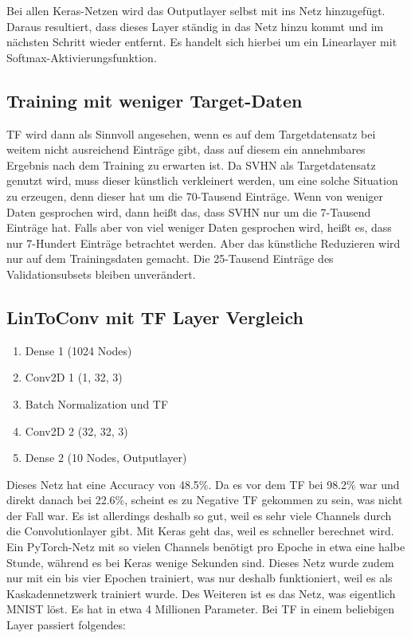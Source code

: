     Bei allen Keras-Netzen wird das Outputlayer selbst mit ins Netz hinzugefügt. Daraus 
    resultiert, dass dieses Layer ständig in das Netz hinzu kommt und im nächsten Schritt 
    wieder entfernt. Es handelt sich hierbei um ein Linearlayer mit Softmax-Aktivierungsfunktion. 

\subsection{Training mit weniger Target-Daten}
    TF wird dann als Sinnvoll angesehen, wenn es auf dem Targetdatensatz bei weitem nicht ausreichend 
    Einträge gibt, dass auf diesem ein annehmbares Ergebnis nach dem Training zu erwarten ist. Da SVHN 
    als Targetdatensatz genutzt wird, muss dieser künstlich verkleinert werden, um eine solche Situation 
    zu erzeugen, denn dieser hat um die 70-Tausend Einträge. Wenn von weniger Daten gesprochen wird, dann 
    heißt das, dass SVHN nur um die 7-Tausend Einträge hat. Falls aber von viel weniger Daten gesprochen 
    wird, heißt es, dass nur 7-Hundert Einträge betrachtet werden. Aber das künstliche Reduzieren wird 
    nur auf dem Trainingsdaten gemacht. Die 25-Tausend Einträge des Validationsubsets bleiben unverändert. 


\subsection{LinToConv mit TF Layer Vergleich}

    \begin{enumerate}
        \item Dense 1 (1024 Nodes)
        \item Conv2D 1 (1, 32, 3)
        \item Batch Normalization und TF
        \item Conv2D 2 (32, 32, 3)
        \item Dense 2 (10 Nodes, Outputlayer)
    \end{enumerate}
    Dieses Netz hat eine Accuracy von 48.5\%. Da es vor dem TF bei 98.2\% war und direkt danach 
    bei 22.6\%, scheint es zu Negative TF gekommen zu sein, was nicht der Fall war. 
    Es ist allerdings deshalb so gut, weil es sehr viele 
    Channels durch die Convolutionlayer gibt. Mit Keras geht das, weil es schneller berechnet 
    wird. Ein PyTorch-Netz mit so vielen Channels benötigt pro Epoche in etwa eine halbe Stunde, 
    während es bei Keras wenige Sekunden sind.
    Dieses Netz wurde zudem nur mit ein bis vier Epochen trainiert, was nur deshalb funktioniert, 
    weil es als Kaskadennetzwerk trainiert wurde. Des Weiteren ist es das Netz, was eigentlich 
    MNIST löst.
    Es hat in etwa 4 Millionen Parameter.
    Bei TF in einem beliebigen Layer passiert folgendes: 

